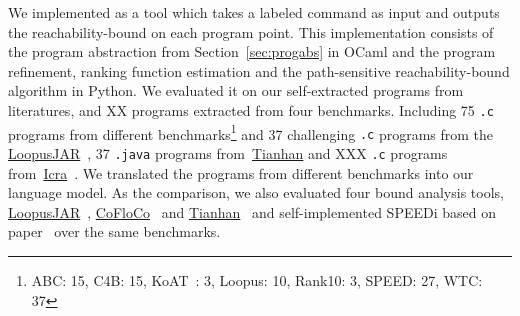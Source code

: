 We implemented {\THESYSTEM} as a tool which takes a labeled command as input  
and outputs the reachability-bound on each program point.
This implementation consists of the 
program abstraction from Section~\ref{sec:progabs} in OCaml and the program refinement, ranking function estimation and the path-sensitive reachability-bound algorithm in Python.
We evaluated it on our self-extracted programs from literatures, and XX programs extracted from four benchmarks. 
Including 75 {\tt .c} programs from different benchmarks\footnote{ABC: 15, C4B: 15, KoAT~\cite{BrockschmidtEFFG14,FalkeKS12,FalkeKS11}: 3, Loopus: 10, Rank10: 3, SPEED: 27, WTC: 37} and 37 challenging {\tt .c} programs 
from the \hyperlink{https://forsyte.at/static/people/sinn/loopusJAR/index.html}{LoopusJAR}~\cite{SinnZV17},
37 {\tt .java} programs from~\hyperlink{https://zenodo.org/record/5140586\#.Y5pBoC-B1QI}{Tianhan}\cite{LuCT21}
and XXX {\tt .c} programs from~\hyperlink{https://github.com/icra-team/icra}{Icra}~\cite{KincaidBCR19,CyphertBKR19}.
We translated the programs from different benchmarks into our language model.
As the comparison, we also evaluated four bound analysis tools, 
\hyperlink{https://forsyte.at/software/loopus/}{LoopusJAR}~\cite{SinnZV17},
\hyperlink{https://github.com/aeflores/CoFloCo/tree/master/src}{CoFloCo}~\cite{Montoya17,Flores-Montoya16,Flores-MontoyaH14}
and \hyperlink{https://zenodo.org/record/5140586\#.Y5pBoC-B1QI}{Tianhan}~\cite{LuCT21}
and self-implemented SPEEDi based on paper~\cite{GulwaniJK09}
over the same benchmarks.

